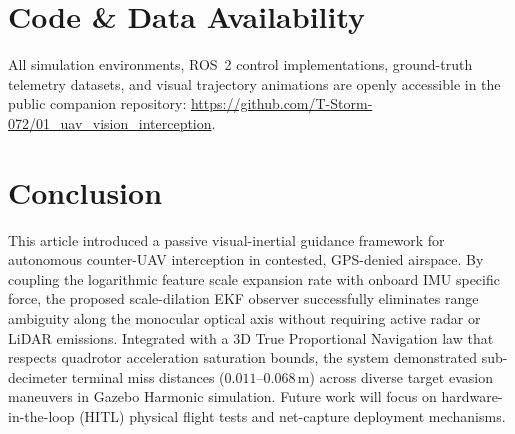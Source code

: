 \documentclass[lettersize,journal]{IEEEtran}
\begin{document}
\section{Code \& Data Availability}
All simulation environments, ROS~2 control implementations, ground-truth telemetry datasets, and visual trajectory animations are openly accessible in the public companion repository: \url{https://github.com/T-Storm-072/01_uav_vision_interception}.

\section{Conclusion}
This article introduced a passive visual-inertial guidance framework for autonomous counter-UAV interception in contested, GPS-denied airspace. By coupling the logarithmic feature scale expansion rate with onboard IMU specific force, the proposed scale-dilation EKF observer successfully eliminates range ambiguity along the monocular optical axis without requiring active radar or LiDAR emissions. Integrated with a 3D True Proportional Navigation law that respects quadrotor acceleration saturation bounds, the system demonstrated sub-decimeter terminal miss distances ($0.011\text{--}0.068\,\text{m}$) across diverse target evasion maneuvers in Gazebo Harmonic simulation. Future work will focus on hardware-in-the-loop (HITL) physical flight tests and net-capture deployment mechanisms.



\end{document}
